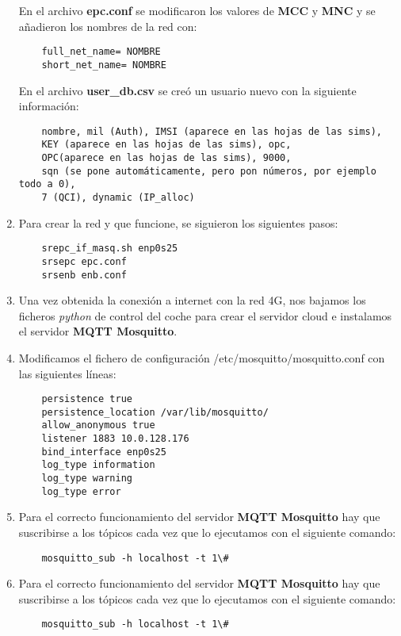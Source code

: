 \begin{enumerate}
En el archivo \textbf{epc.conf} se modificaron los valores de \textbf{MCC} y \textbf{MNC} y se añadieron los nombres de la red con:
\begin{lstlisting}
    full_net_name= NOMBRE
    short_net_name= NOMBRE
\end{lstlisting}

En el archivo \textbf{user_db.csv} se creó un usuario nuevo con la siguiente información:
\begin{lstlisting}
    nombre, mil (Auth), IMSI (aparece en las hojas de las sims),
    KEY (aparece en las hojas de las sims), opc,
    OPC(aparece en las hojas de las sims), 9000,
    sqn (se pone automáticamente, pero pon números, por ejemplo todo a 0),
    7 (QCI), dynamic (IP_alloc)
\end{lstlisting}

\item Para crear la red y que funcione, se siguieron los siguientes pasos:
\begin{lstlisting}
    srepc_if_masq.sh enp0s25
    srsepc epc.conf
    srsenb enb.conf
\end{lstlisting}

\item Una vez obtenida la conexión a internet con la red 4G, nos bajamos los ficheros \textit{python} de control del coche para crear el servidor cloud e instalamos el servidor \textbf{MQTT Mosquitto}.

\item Modificamos el fichero de configuración /etc/mosquitto/mosquitto.conf con las siguientes líneas:
\begin{lstlisting}
	persistence true
	persistence_location /var/lib/mosquitto/
	allow_anonymous true
	listener 1883 10.0.128.176
	bind_interface enp0s25
	log_type information
	log_type warning
	log_type error
\end{lstlisting}

\item Para el correcto funcionamiento del servidor \textbf{MQTT Mosquitto} hay que suscribirse a los tópicos cada vez que lo ejecutamos con el siguiente comando:
\begin{lstlisting}
	mosquitto_sub -h localhost -t 1\#
\end{lstlisting}


\item Para el correcto funcionamiento del servidor \textbf{MQTT Mosquitto} hay que suscribirse a los tópicos cada vez que lo ejecutamos con el siguiente comando:
\begin{lstlisting}
	mosquitto_sub -h localhost -t 1\#
\end{lstlisting}


\end{enumerate}
